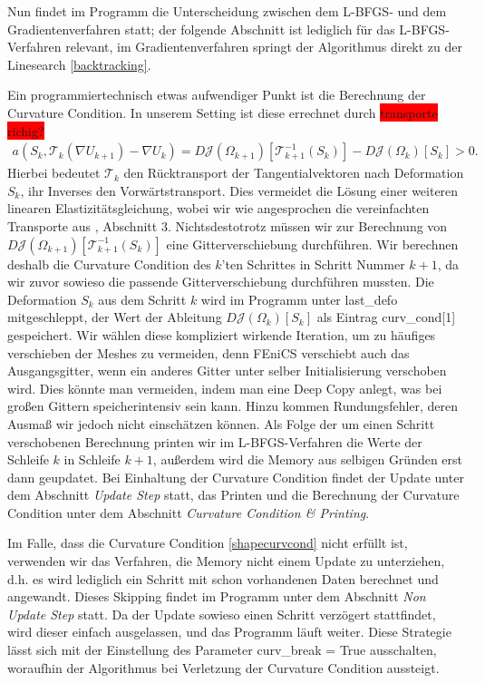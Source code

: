 Nun findet im Programm die Unterscheidung zwischen dem L-BFGS- und dem Gradientenverfahren statt; der folgende Abschnitt ist lediglich für das L-BFGS-Verfahren relevant, im Gradientenverfahren springt der Algorithmus direkt zu der Linesearch \ref{backtracking}.

Ein programmiertechnisch etwas aufwendiger Punkt ist die Berechnung der Curvature Condition. In unserem Setting ist diese errechnet durch \colorbox{red}{transporte richig?}
\begin{equation}
\label{shapecurvcond}
\begin{aligned}
	a(S_k, \mathcal{T}_k(\nabla U_{k+1}) - \nabla U_k) = D\mathcal{J}(\Omega_{k+1})[\mathcal{T}_{k+1}^{-1}(S_k)] - D\mathcal{J}(\Omega_k)[S_k] > 0.
\end{aligned}
\end{equation}
Hierbei bedeutet $\mathcal{T}_{k}$ den Rücktransport der Tangentialvektoren nach Deformation $S_k$, ihr Inverses den Vorwärtstransport. Dies vermeidet die Lösung einer weiteren linearen Elastizitätsgleichung, wobei wir wie angesprochen die vereinfachten Transporte aus \cite{diffusion}, Abschnitt 3. Nichtsdestotrotz müssen wir zur Berechnung von $D\mathcal{J}(\Omega_{k+1})[\mathcal{T}_{k+1}^{-1}(S_k)]$ eine Gitterverschiebung durchführen. Wir berechnen deshalb die Curvature Condition des $k$'ten Schrittes in Schritt Nummer $k+1$, da wir zuvor sowieso die passende Gitterverschiebung durchführen mussten. Die Deformation $S_k$ aus dem Schritt $k$ wird im Programm unter \textsf{last\_defo} mitgeschleppt, der Wert der Ableitung $D\mathcal{J}(\Omega_k)[S_k]$ als Eintrag \textsf{curv\_cond[1]} gespeichert. Wir wählen diese kompliziert wirkende Iteration, um zu häufiges verschieben der Meshes zu vermeiden, denn FEniCS verschiebt auch das Ausgangsgitter, wenn ein anderes Gitter unter selber Initialisierung verschoben wird. Dies könnte man vermeiden, indem man eine Deep Copy anlegt, was bei großen Gittern speicherintensiv sein kann. Hinzu kommen Rundungsfehler, deren Ausmaß wir jedoch nicht einschätzen können.
Als Folge der um einen Schritt verschobenen Berechnung printen wir im L-BFGS-Verfahren die Werte der Schleife $k$ in Schleife $k+1$, außerdem wird die Memory aus selbigen Gründen erst dann geupdatet. Bei Einhaltung der Curvature Condition findet der Update unter dem Abschnitt \textit{Update Step} statt, das Printen und die Berechnung der Curvature Condition unter dem Abschnitt \textit{Curvature Condition \& Printing}. 

Im Falle, dass die Curvature Condition \ref{shapecurvcond} nicht erfüllt ist, verwenden wir das Verfahren, die Memory nicht einem Update zu unterziehen, d.h. es wird lediglich ein Schritt mit schon vorhandenen Daten berechnet und angewandt. Dieses Skipping findet im Programm unter dem Abschnitt \textit{Non Update Step} statt. Da der Update sowieso einen Schritt verzögert stattfindet, wird dieser einfach ausgelassen, und das Programm läuft weiter. Diese Strategie lässt sich mit der Einstellung des Parameter \textsf{curv\_break = True} ausschalten, woraufhin der Algorithmus bei Verletzung der Curvature Condition aussteigt.

